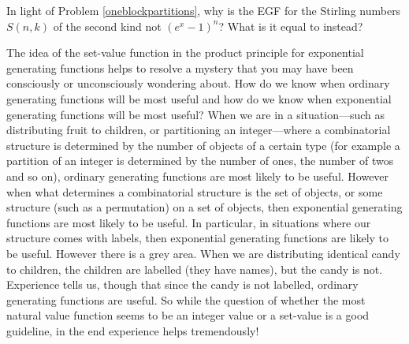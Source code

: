 \itemes In light of Problem \ref{oneblockpartitions}, why is the EGF for
the Stirling numbers
$S(n,k)$ of the second kind not
$(e^x -1)^n$?  What is it equal to instead?
\ep

The idea of the set-value function in the product principle for
exponential generating functions helps to resolve a mystery that you may
have been consciously or unconsciously wondering about.  How do we know
when ordinary generating functions will be most useful and how do we know
when exponential generating functions will be most useful?  When we are
in a situation---such as distributing fruit to children, or partitioning
an integer---where a combinatorial structure is determined by the number
of objects of a certain type (for example a partition of an integer is
determined by the number of ones, the number of twos and so on), ordinary
generating functions are most likely to be useful.  However when what
determines a combinatorial structure is the set of objects, or some
structure (such as a permutation) on a set of objects, then exponential
generating functions are most likely to be useful.  In particular, in
situations where our structure comes with labels, then exponential
generating functions are likely to be useful.  However there is a grey
area.  When we are distributing identical candy to children, the children
are labelled (they have names), but the candy is not.  Experience tells
us, though that since the candy is not labelled, ordinary generating
functions are useful.  So while the question of whether the most natural
value function seems to be an integer value or a set-value is a good
guideline, in the end experience helps tremendously! 

